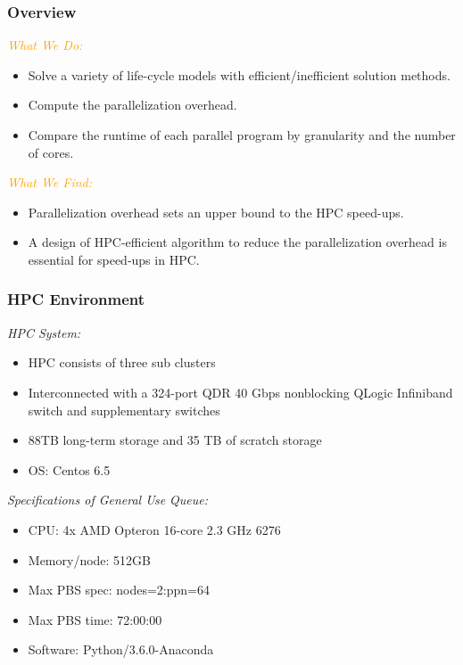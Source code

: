 \documentclass[xcolor=x11names,compress]{beamer}
\renewcommand{\(}{\begin{columns}}
\renewcommand{\)}{\end{columns}}
\newcommand{\<}[1]{\begin{column}{#1}}
\renewcommand{\>}{\end{column}}
\begin{document}
\begin{frame}
\frametitle{Overview}
\textcolor{orange}{\textit{What We Do:}}
\begin{itemize}
\item Solve a variety of life-cycle models with efficient/inefficient solution methods.
\item Compute the parallelization overhead.
\item Compare the runtime of each parallel program by granularity and the number of cores.
\end{itemize}
\bigskip
\textcolor{orange}{\textit{What We Find:}}
\begin{itemize}
\item Parallelization overhead sets an upper bound to the HPC speed-ups.
\item A design of HPC-efficient algorithm to reduce the parallelization overhead is essential for speed-ups in HPC.
\end{itemize}
\end{frame}




\begin{frame}
\frametitle{HPC Environment}
\textit{HPC System:}
\begin{itemize}
\item HPC consists of three sub clusters
\item Interconnected with a 324-port QDR 40 Gbps nonblocking QLogic Infiniband switch and supplementary switches
\item 88TB long-term storage and 35 TB of scratch storage
\item OS: Centos 6.5
\end{itemize}
\smallskip
\textit{Specifications of General Use Queue:}
\begin{itemize}
\item CPU: 4x AMD Opteron 16-core 2.3 GHz 6276
\item Memory/node: 512GB
\item Max PBS spec: nodes=2:ppn=64
\item Max PBS time: 72:00:00
\item Software: Python/3.6.0-Anaconda
\end{itemize}

\end{frame}


\end{document}

